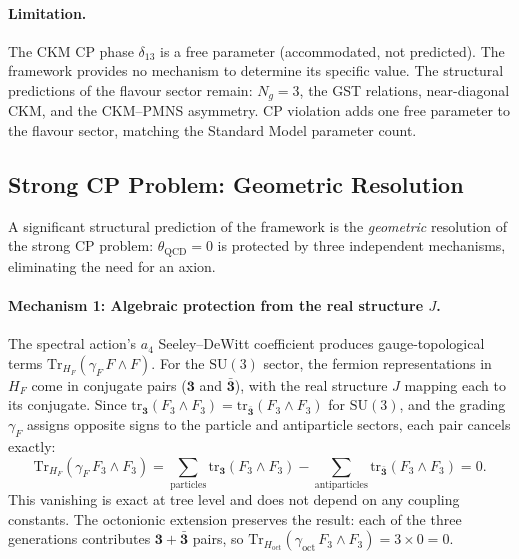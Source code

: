 \paragraph{Limitation.}
The CKM CP phase $\delta_{13}$ is a free parameter (accommodated, not predicted).  The framework provides no mechanism to determine its specific value.  The structural predictions of the flavour sector remain: $N_g = 3$, the GST relations, near-diagonal CKM, and the CKM--PMNS asymmetry.  CP violation adds one free parameter to the flavour sector, matching the Standard Model parameter count.


\subsection{Strong CP Problem: Geometric Resolution}
\label{sec:4-strong-cp}

A significant structural prediction of the framework is the \emph{geometric} resolution of the strong CP problem: $\theta_{\mathrm{QCD}} = 0$ is protected by three independent mechanisms, eliminating the need for an axion.

\paragraph{Mechanism 1: Algebraic protection from the real structure $J$.}
The spectral action's $a_4$ Seeley--DeWitt coefficient produces gauge-topological terms $\mathrm{Tr}_{H_F}(\gamma_F\, F \wedge F)$.  For the $\mathrm{SU}(3)$ sector, the fermion representations in $H_F$ come in conjugate pairs ($\mathbf{3}$ and $\bar{\mathbf{3}}$), with the real structure $J$ mapping each to its conjugate.  Since $\mathrm{tr}_{\mathbf{3}}(F_3 \wedge F_3) = \mathrm{tr}_{\bar{\mathbf{3}}}(F_3 \wedge F_3)$ for $\mathrm{SU}(3)$, and the grading $\gamma_F$ assigns opposite signs to the particle and antiparticle sectors, each pair cancels exactly:
\begin{equation}
  \mathrm{Tr}_{H_F}(\gamma_F\, F_3 \wedge F_3)
  = \sum_{\mathrm{particles}} \mathrm{tr}_{\mathbf{3}}(F_3 \wedge F_3)
    - \sum_{\mathrm{antiparticles}} \mathrm{tr}_{\bar{\mathbf{3}}}(F_3 \wedge F_3)
  = 0.
  \label{eq:4-theta-vanish}
\end{equation}
This vanishing is exact at tree level and does not depend on any coupling constants.  The octonionic extension preserves the result: each of the three generations contributes $\mathbf{3} + \bar{\mathbf{3}}$ pairs, so $\mathrm{Tr}_{H_{\mathrm{oct}}}(\gamma_{\mathrm{oct}}\, F_3 \wedge F_3) = 3 \times 0 = 0$.

